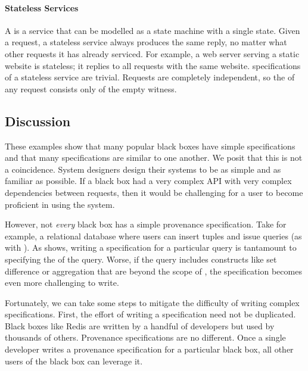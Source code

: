 \paragraph{Stateless Services}
A  is a service that can be modelled as a state
machine with a single state. Given a request, a stateless service always
produces the same reply, no matter what other requests it has already serviced.
For example, a web server serving a static website is stateless; it replies to
all requests with the same website. \Watprovenance{} specifications of a
stateless service are trivial. Requests are completely independent, so the
\watprovenance{} of any request consists only of the empty witness.

\subsection{Discussion}
These examples show that many popular black boxes have simple \watprovenance{}
specifications and that many \watprovenance{} specifications are similar to one
another. We posit that this is not a coincidence. System designers
design their systems to be as simple and as familiar as possible. If a black
box had a very complex API with very complex dependencies between requests,
then it would be challenging for a user to become proficient in using the
system.

However, not \emph{every} black box has a simple provenance specification. Take
for example, a relational database where users can insert tuples and issue
queries (as with ). As 
shows, writing a \watprovenance{} specification for a particular query is
tantamount to specifying the \whyprovenance{} of the query. Worse, if the
query includes constructs like set difference or aggregation that are beyond
the scope of \whyprovenance{}, the \watprovenance{} specification becomes even
more challenging to write.

Fortunately, we can take some steps to mitigate the difficulty of writing
complex \watprovenance{} specifications.  First, the effort of writing a
\watprovenance{} specification need not be duplicated. Black boxes like Redis
are written by a handful of developers but used by thousands of others.
Provenance specifications are no different. Once a single developer writes a
provenance specification for a particular black box, all other users of the
black box can leverage it.

